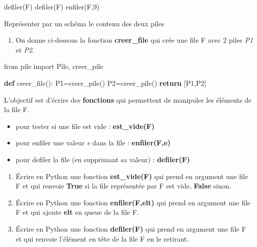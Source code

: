 \documentclass[11pt]{article}
\providecommand{\tightlist}{%
      \setlength{\itemsep}{0pt}\setlength{\parskip}{0pt}}
\newenvironment{Shaded}{}{}
\newcommand{\KeywordTok}[1]{\textcolor[rgb]{0.00,0.44,0.13}{\textbf{{#1}}}}
\newcommand{\DecValTok}[1]{\textcolor[rgb]{0.25,0.63,0.44}{{#1}}}
\newcommand{\NormalTok}[1]{{#1}}
\newcommand{\ImportTok}[1]{{#1}}
\newcommand{\ControlFlowTok}[1]{\textcolor[rgb]{0.00,0.44,0.13}{\textbf{{#1}}}}
\newcommand{\OperatorTok}[1]{\textcolor[rgb]{0.40,0.40,0.40}{{#1}}}
\begin{document}
\begin{Shaded}
\begin{Highlighting}[]
\NormalTok{defiler(F)}
\NormalTok{defiler(F)}
\NormalTok{enfiler(F,}\DecValTok{9}\NormalTok{)}
\end{Highlighting}
\end{Shaded}

Représenter par un schéma le contenu des deux piles

\begin{enumerate}
\def\labelenumi{\arabic{enumi}.}
\setcounter{enumi}{2}
\tightlist
\item
  On donne ci-dessous la fonction \textbf{creer\_file} qui crée une file
  F avec 2 piles \emph{P1} et \emph{P2}.
\end{enumerate}

\begin{Shaded}
\begin{Highlighting}[]
\ImportTok{from}\NormalTok{ pile }\ImportTok{import}\NormalTok{ Pile, creer\_pile}

\KeywordTok{def}\NormalTok{ creer\_file():}
\NormalTok{    P1}\OperatorTok{=}\NormalTok{creer\_pile()}
\NormalTok{    P2}\OperatorTok{=}\NormalTok{creer\_pile()}
    \ControlFlowTok{return}\NormalTok{ [P1,P2]}
\end{Highlighting}
\end{Shaded}

L'objectif est d'écrire des \textbf{fonctions} qui permettent de
manipuler les éléments de la file F.

\begin{itemize}
\tightlist
\item
  pour tester si une file est vide : \textbf{est\_vide(F)}
\item
  pour enfiler une valeur \emph{e} dans la file : \textbf{enfiler(F,e)}
\item
  pour defiler la file (en supprimant sa valeur) : \textbf{defiler(F)}
\end{itemize}

\begin{enumerate}
\def\labelenumi{\alph{enumi})}
\item
  Écrire en Python une fonction \textbf{est\_vide(F)} qui prend en
  argument une file F et qui renvoie \textbf{True} si la file
  représentée par F est vide, \textbf{False} sinon.
\item
  Écrire en Python une fonction \textbf{enfiler(F,elt)} qui prend en
  argument une file F et qui ajoute \textbf{elt} en queue de la file F.
\item
  Écrire en Python une fonction \textbf{defiler(F)} qui prend en
  argument une file F et qui renvoie l'élément en tête de la file F en
  le retirant.
\end{enumerate}
\end{document}
